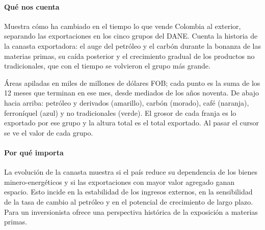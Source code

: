 \paragraph{Qué nos cuenta}
Muestra cómo ha cambiado en el tiempo lo que vende Colombia al exterior, separando las exportaciones en los cinco grupos del DANE. Cuenta la historia de la canasta exportadora: el auge del petróleo y el carbón durante la bonanza de las materias primas, su caída posterior y el crecimiento gradual de los productos no tradicionales, que con el tiempo se volvieron el grupo más grande.

\begin{leer}
Áreas apiladas en miles de millones de dólares FOB; cada punto es la suma de los 12 meses que terminan en ese mes, desde mediados de los años noventa. De abajo hacia arriba: petróleo y derivados (amarillo), carbón (morado), café (naranja), ferroníquel (azul) y no tradicionales (verde). El grosor de cada franja es lo exportado por ese grupo y la altura total es el total exportado. Al pasar el cursor se ve el valor de cada grupo.
\end{leer}

\paragraph{Por qué importa}
La evolución de la canasta muestra si el país reduce su dependencia de los bienes minero-energéticos y si las exportaciones con mayor valor agregado ganan espacio. Esto incide en la estabilidad de los ingresos externos, en la sensibilidad de la tasa de cambio al petróleo y en el potencial de crecimiento de largo plazo. Para un inversionista ofrece una perspectiva histórica de la exposición a materias primas.

